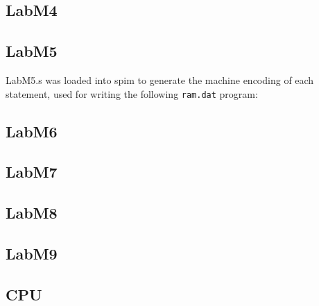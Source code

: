 \documentclass{article}
\begin{document}
\subsection{LabM4}


\subsection{LabM5}


LabM5.s was loaded into spim to generate the machine encoding of each
statement, used for writing the following \verb$ram.dat$ program:


\subsection{LabM6}


\subsection{LabM7}


\subsection{LabM8}


\subsection{LabM9}


\subsection{CPU}


\end{document}
